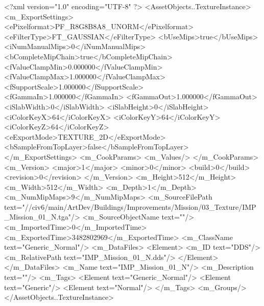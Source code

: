 <?xml version="1.0" encoding="UTF-8" ?>
<AssetObjects..TextureInstance>
	<m_ExportSettings>
		<ePixelformat>PF_R8G8B8A8_UNORM</ePixelformat>
		<eFilterType>FT_GAUSSIAN</eFilterType>
		<bUseMips>true</bUseMips>
		<iNumManualMips>0</iNumManualMips>
		<bCompleteMipChain>true</bCompleteMipChain>
		<fValueClampMin>0.000000</fValueClampMin>
		<fValueClampMax>1.000000</fValueClampMax>
		<fSupportScale>1.000000</fSupportScale>
		<fGammaIn>1.000000</fGammaIn>
		<fGammaOut>1.000000</fGammaOut>
		<iSlabWidth>0</iSlabWidth>
		<iSlabHeight>0</iSlabHeight>
		<iColorKeyX>64</iColorKeyX>
		<iColorKeyY>64</iColorKeyY>
		<iColorKeyZ>64</iColorKeyZ>
		<eExportMode>TEXTURE_2D</eExportMode>
		<bSampleFromTopLayer>false</bSampleFromTopLayer>
	</m_ExportSettings>
	<m_CookParams>
		<m_Values/>
	</m_CookParams>
	<m_Version>
		<major>1</major>
		<minor>0</minor>
		<build>0</build>
		<revision>0</revision>
	</m_Version>
	<m_Height>512</m_Height>
	<m_Width>512</m_Width>
	<m_Depth>1</m_Depth>
	<m_NumMipMaps>9</m_NumMipMaps>
	<m_SourceFilePath text="//civ6/main/ArtDev/Buildings/Improvements/Mission/03_Texture/IMP_Mission_01_N.tga"/>
	<m_SourceObjectName text=""/>
	<m_ImportedTime>0</m_ImportedTime>
	<m_ExportedTime>3482802969</m_ExportedTime>
	<m_ClassName text="Generic_Normal"/>
	<m_DataFiles>
		<Element>
			<m_ID text="DDS"/>
			<m_RelativePath text="IMP_Mission_01_N.dds"/>
		</Element>
	</m_DataFiles>
	<m_Name text="IMP_Mission_01_N"/>
	<m_Description text=""/>
	<m_Tags>
		<Element text="Generic_Normal"/>
		<Element text="Generic"/>
		<Element text="Normal"/>
	</m_Tags>
	<m_Groups/>
</AssetObjects..TextureInstance>

